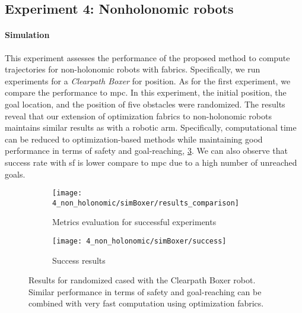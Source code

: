 \subsection{Experiment 4: Nonholonomic robots}%
\label{sub:experiment_4_nonholonomic_robots}

\paragraph{Simulation}
This experiment assesses the performance of the proposed method to compute
trajectories for non-holonomic robots with fabrics. Specifically, we run
experiments for a \textit{Clearpath Boxer} for position. As
for the first experiment, we compare the performance to \ac{mpc}. In this
experiment, the initial position, the goal location, and the position of five
obstacles were randomized. The results reveal that our extension of
optimization fabrics to non-holonomic robots maintains similar results as with
a robotic arm. Specifically, computational time can be reduced to
optimization-based methods while maintaining good performance in terms of
safety and goal-reaching, \cref{fig:experiment4_simBoxer}. We can also observe
that success rate with \ac{sf} is lower compare to \ac{mpc} due to a high
number of unreached goals.

\begin{figure}[h]
  \centering
  \begin{subfigure}{1.0\linewidth}
    \centering
    \texttt{[image: 4\_non\_holonomic/simBoxer/results\_comparison]}
    \caption{Metrics evaluation for successful experiments}%
    \label{subfig:experiment4_simBoxer_res}
  \end{subfigure}
  \begin{subfigure}{1.0\linewidth}
    \centering
    \texttt{[image: 4\_non\_holonomic/simBoxer/success]}
    \caption{Success results}%
    \label{subfig:experiment4_simBoxer_success}
  \end{subfigure}
  \caption{Results for randomized cased with the Clearpath Boxer robot.
    Similar performance in terms of safety and goal-reaching can be combined with very
    fast computation using optimization fabrics.
  }%
  \label{fig:experiment4_simBoxer}
\end{figure}


